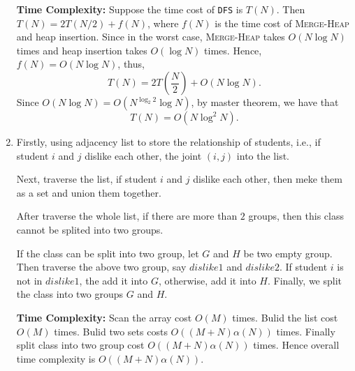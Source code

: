\documentclass[12pt,a4paper,titlepage,AutoFakeBold]{article}
\begin{document}
\begin{enumerate}[label=\arabic*.,topsep=0pt]
    \textbf{Time Complexity:} Suppose the time cost of \texttt{DFS} is $T(N)$. Then $T(N) = 2T(N/2) + f(N)$, where $f(N)$ is the time cost of \textsc{Merge-Heap} and heap insertion. Since in the worst case, \textsc{Merge-Heap} takes $O(N\log N)$ times and heap insertion takes $O(\log N)$ times. Hence, $f(N) = O(N\log N)$, thus, 
    \[
        T(N) = 2T \left(\frac{N}{2}\right) + O(N\log N).
    \] Since $O(N\log N) = O(N^{\log_2 2}\log N)$, by master theorem, we have that 
    \[
        T(N) = O(N\log^2 N).
    \]
    \item Firstly, using adjacency list to store the relationship of students, i.e., if 
    student $i$ and $j$ dislike each other, the joint $(i, j)$ into the list.

    Next, traverse the list, if student $i$ and $j$ dislike each other, then 
    meke them as a set and union them together. 
    
    After traverse the whole list, 
    if there are more than $2$ groups, then this class cannot
    be splited into two groups.

    If the class can be split into two group, let $G$ and $H$ be two empty group.
    Then traverse the above two group, say $dislike1$ and $dislike2$. If student $i$ is not in $dislike1$, the add it into $G$, otherwise, add it into $H$.
    Finally, we split the class into two groups $G$ and $H$.

    \textbf{Time Complexity:} Scan the array cost $O(M)$ times. Bulid the list cost $O(M)$ times. Bulid two sets costs $O((M+N)\alpha(N))$ times. Finally split class into two group cost
    $O((M+N)\alpha(N))$ times. Hence overall time complexity is $O((M+N)\alpha(N))$.
\end{enumerate}
\newpage
\end{document}
